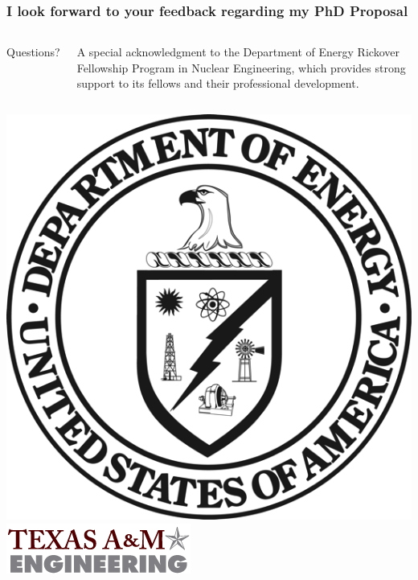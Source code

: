 \documentclass[compress,10pt]{beamer}
\newlength \figwidth
\begin{document}
\begin{frame}[plain]
   \frametitle{I look forward to your feedback regarding my PhD Proposal}

\vspace{25mm}

\begin{columns}[b]


\centering

{\Large Questions?}

\vspace{9mm}
\footnotesize
A special acknowledgment to the Department of Energy Rickover Fellowship Program in Nuclear Engineering, which provides strong support to its fellows and their professional development.

\end{columns}

\vspace{10mm}

\begin{columns}[b]

\centering
{}\includegraphics[width=0.35\figwidth]{images/DOE_logo.png}\\

\centering
{}\includegraphics[width=0.70\figwidth]{images/tamu_engineering.png}\\

\end{columns}

\end{frame}
\end{document}
